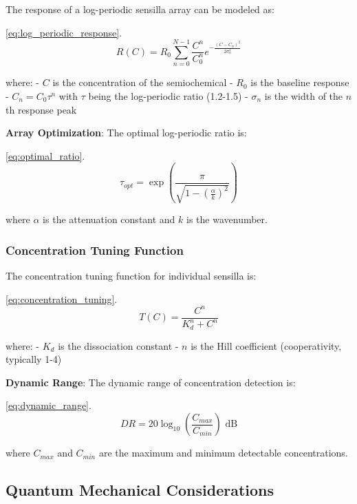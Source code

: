 \documentclass[
  13pt,
  a4paperpaper,
  12pt]{article}
\begin{document}
The response of a log-periodic sensilla array can be modeled as:

\eqref{eq:log_periodic_response}. \begin{equation}
R(C) = R_0 \sum_{n=0}^{N-1} \frac{C^n}{C_0^n} e^{-\frac{(C - C_n)^2}{2\sigma_n^2}} \label{eq:log_periodic_response}
\end{equation}

where: - \(C\) is the concentration of the semiochemical - \(R_0\) is
the baseline response - \(C_n = C_0 \tau^n\) with \(\tau\) being the
log-periodic ratio (1.2-1.5) - \(\sigma_n\) is the width of the \(n\)th
response peak

\textbf{Array Optimization}: The optimal log-periodic ratio is:

\eqref{eq:optimal_ratio}. \begin{equation}
\tau_{opt} = \exp\left(\frac{\pi}{\sqrt{1 - \left(\frac{\alpha}{k}\right)^2}}\right) \label{eq:optimal_ratio}
\end{equation}

where \(\alpha\) is the attenuation constant and \(k\) is the
wavenumber.

\subsubsection{Concentration Tuning
Function}\label{concentration-tuning-function}

The concentration tuning function for individual sensilla is:

\eqref{eq:concentration_tuning}. \begin{equation}
T(C) = \frac{C^n}{K_d^n + C^n} \label{eq:concentration_tuning}
\end{equation}

where: - \(K_d\) is the dissociation constant - \(n\) is the Hill
coefficient (cooperativity, typically 1-4)

\textbf{Dynamic Range}: The dynamic range of concentration detection is:

\eqref{eq:dynamic_range}. \begin{equation}
DR = 20 \log_{10}\left(\frac{C_{max}}{C_{min}}\right) \text{ dB} \label{eq:dynamic_range}
\end{equation}

where \(C_{max}\) and \(C_{min}\) are the maximum and minimum detectable
concentrations.

\subsection{Quantum Mechanical
Considerations}\label{quantum-mechanical-considerations}
\end{document}
